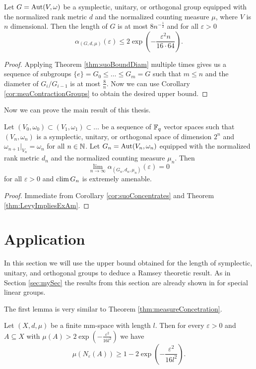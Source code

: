 \begin{corollary}\label{cor:suoConcentrates}
Let $G=\operatorname{Aut}(V,\omega)$ be a symplectic, unitary, or orthogonal group equipped with the normalized rank metric $d$ and the normalized counting measure $\mu$, where $V$ is $n$ dimensional. Then the length of $G$ is at most $8n^{-\frac{1}{2}}$ and for all $\varepsilon>0$
\[\alpha_{(G,d,\mu)}(\varepsilon)\leq 2\exp\left(-\frac{\varepsilon^2n}{16\cdot64}\right).\]
\end{corollary}
\begin{proof}
Applying Theorem \ref{thm:suoBoundDiam} multiple times gives us a sequence of subgroups $\{e\}=G_0\leq \dots\leq G_m=G$ such that $m\leq n$ and the diameter of $G_i/G_{i-1}$ is at most $\frac{8}{n}$. Now we can use Corollary \ref{cor:meaContractionGroups} to obtain the desired upper bound.
\end{proof}


Now we can prove the main result of this thesis.
\begin{corollary}
Let $(V_0,\omega_0)\subset (V_1,\omega_1)\subset \dots$ be a sequence of $\mathbb{F}_q$ vector spaces such that $(V_n,\omega_n)$ is a symplectic, unitary, or orthogonal space of dimension $2^n$ and $\omega_{n+1}|_{V_n}=\omega_n$ for all $n\in\mathbb{N}$. Let $G_{n}=\operatorname{Aut}(V_n,\omega_n)$ equipped with the normalized rank metric $d_n$ and the normalized counting measure $\mu_n$. 
Then \[\lim_{n\to\infty}\alpha_{(G_n,d_n,\mu_n)}(\varepsilon)=0\] for all $\varepsilon>0$ and $\operatorname{clim} G_n$ is extremely amenable.
\end{corollary}
\begin{proof}
Immediate from Corollary \ref{cor:suoConcentrates} and Theorem \ref{thm:LevyImpliesExAm}.
\end{proof}

\section{Application}\label{sec:ramsey}
In this section we will use the upper bound obtained for the length of symplectic, unitary, and orthogonal groups to deduce a Ramsey theoretic result. %
As in Section \ref{sec:mySec} the results from this section are already shown in \cite{thom} for special linear groups. 

The first lemma is very similar to Theorem \ref{thm:measureConcetration}.
\begin{lemma}\label{lem:measureOfNeigh}
Let $(X,d,\mu)$ be a finite mm-space with length $l$. Then for every $\varepsilon>0$ and $A\subseteq X$ with $\mu(A)>2\exp\left(-\frac{\varepsilon^2}{16l^2}\right)$ we have
\[\mu(N_\varepsilon(A))\geq 1-2\exp\left(-\frac{\varepsilon^2}{16l^2}\right).\]
\end{lemma}


